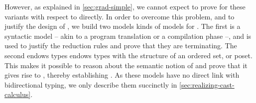 \AP However, as explained in \cref{sec:grad-simple}, we cannot expect to prove 
for these  variants with respect to  directly.
In order to overcome this problem, and to justify the design of ,
we build two models kinds of models for . The first%
 is a syntactic model
 – akin to a program translation or a compilation phase –,
and is used to justify the reduction rules and prove that they are terminating.
The second%
endows types endows types with the structure of an ordered set, or poset. This makes it
possible to reason about the semantic notion of  and prove that it gives rise to ,
thereby establishing .
%
As these models have no direct link with bidirectional typing, we only describe them
succinctly in \cref{sec:realizing-cast-calculus}.